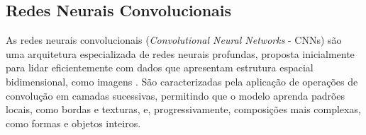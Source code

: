 \documentclass[12pt]{article}
\begin{document}

\subsection{Redes Neurais Convolucionais}
\label{sec:review:cnn}

As redes neurais convolucionais (\emph{Convolutional Neural Networks} - CNNs) são uma arquitetura especializada de redes neurais profundas, proposta inicialmente para lidar eficientemente com dados que apresentam estrutura espacial bidimensional, como imagens \cite{lecun1998gradient}. São caracterizadas pela aplicação de operações de convolução em camadas sucessivas, permitindo que o modelo aprenda padrões locais, como bordas e texturas, e, progressivamente, composições mais complexas, como formas e objetos inteiros.
\end{document}
